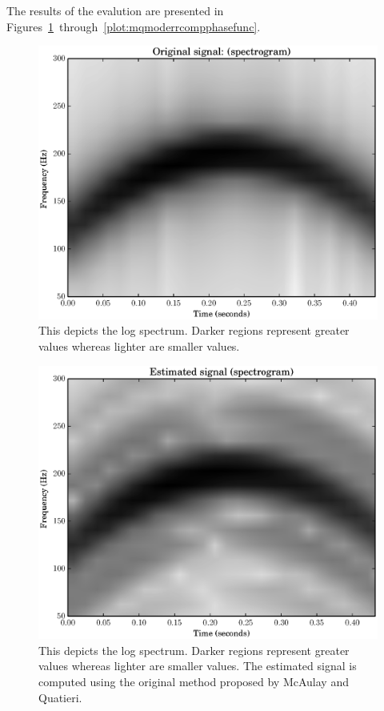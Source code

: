 The results of the evalution are presented in
Figures~\ref{plot:mqcubicoriginalspec}~through~\ref{plot:mqmoderrcompphasefunc}.


\begin{figure}[!t]
    \centering
    \includegraphics[width=\figwidthscale\textwidth]{plots/mq_cubic_original_spec.eps}
    \caption{This depicts the log spectrum. Darker regions represent greater
        values whereas lighter are smaller values.
    \label{plot:mqcubicoriginalspec}}
\end{figure}

\begin{figure}[!t]
    \centering
    \includegraphics[width=\figwidthscale\textwidth]{plots/mq_cubic_estimated_spec.eps}
    \caption{This depicts the log spectrum. Darker regions represent greater
        values whereas lighter are smaller values. The estimated signal is
        computed using the original method proposed by McAulay and Quatieri.
    \label{plot:mqcubicestimatedspec}}
\end{figure}


